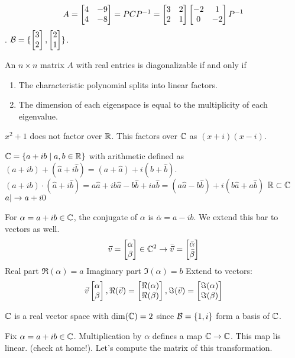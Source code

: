 \documentclass[10pt,a4paper]{article}
\begin{document}
\begin{example}
	$$A =\begin{bmatrix}4 & -9 \\ 4 & -8\end{bmatrix} = PCP^{-1} = \begin{bmatrix}3&2\\2&1\end{bmatrix}\begin{bmatrix}-2&1\\0&-2\end{bmatrix}P^{-1}$$.
	$\mathcal{B} = \{\begin{bmatrix}3\\2\end{bmatrix},\begin{bmatrix}2\\1\end{bmatrix}\}$.
\end{example}

\begin{recall}
	An $n\times n$ matrix $A$ with real entries is diagonalizable if and only if
	\begin{enumerate}
		\item The characteristic polynomial splits into linear factors.
		\item The dimension of each eigenspace is equal to the multiplicity of each eigenvalue.
	\end{enumerate}
\end{recall}
\begin{example}
	$x^2 + 1$ does not factor over $\mathbb{R}$. This factors over $\mathbb{C}$ as $(x+i)(x-i)$.
\end{example}
\begin{definition}
	$\mathbb{C} = \{a+ib \mid a,b\in \mathbb{R}\}$ with arithmetic defined as $(a+ib)+(\hat a + i \hat b) = (a + \hat a) + i(b + \hat b)$. $(a+ib)\cdot (\hat a + i \hat b) = a \hat a + i b \hat a - b \hat b + i a \hat b = (a\hat a - b \hat b) + i (b\hat a + a \hat b)$
	$\mathbb{R} \subset \mathbb{C}$
	$a |\rightarrow a + i0$
	
	For $\alpha = a + ib \in \mathbb{C}$, the conjugate of $\alpha$ is $\bar \alpha = a - ib$. We extend this bar to vectors as well.
	$$\vec{v} = \begin{bmatrix}\alpha \\ \beta\end{bmatrix} \in \mathbb{C}^2 \rightarrow \bar{\vec{v}} = \begin{bmatrix}\bar \alpha \\ \bar \beta\end{bmatrix}$$
	Real part $\Re(\alpha) = a$
	Imaginary part $\Im(\alpha) = b$
	Extend to vectors:
	$$\vec{v} \begin{bmatrix}\alpha \\ \beta\end{bmatrix}, \Re(\vec{v}) = \begin{bmatrix}\Re(\alpha) \\ \Re(\beta)\end{bmatrix}, \Im(\vec{v}) = \begin{bmatrix}\Im(\alpha)\\\Im(\beta)\end{bmatrix}$$
\end{definition}
$\mathbb{C}$ is a real vector space with $\dim(\mathbb{C}) = 2$ since $\mathcal{B} = \{1,i\}$ form a basis of $\mathbb{C}$.

Fix $\alpha = a + ib\in \mathbb{C}$. Multiplication by $\alpha$ defines a map $\mathbb{C} \rightarrow \mathbb{C}$. This map lis linear. (check at home!). Let's compute the matrix of this transformation.
\end{document}
